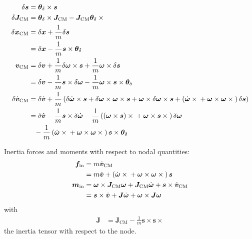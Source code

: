\documentclass[10pt,dvips,fleqn,subeqn]{report}
\newcommand{\T}[1]{\bm{#1}}
\newcommand{\TT}[1]{\bm{#1}}
\begin{document}
\begin{subequations}
\begin{align}
	\delta\T{s}
		&= \T{\theta}_{\delta} \times \T{s} \\
	\delta \TT{J}_{\text{CM}}
		&= \T{\theta}_{\delta} \times \TT{J}_{\text{CM}}
		- \TT{J}_{\text{CM}} \T{\theta}_{\delta} \times{} \\
	\delta\T{x}_{\text{CM}}
		&= \delta\T{x} + \frac{1}{m} \delta\T{s}
		\nonumber \\
		&= \delta\T{x} - \frac{1}{m} \T{s} \times \T{\theta}_{\delta} \\
	\T{v}_{\text{CM}}
		&= \delta\T{v}
		+ \frac{1}{m} \delta\T{\omega} \times \T{s}
		+ \frac{1}{m} \T{\omega} \times \delta\T{s}
		\nonumber \\
		&= \delta\T{v}
		- \frac{1}{m} \T{s} \times \delta\T{\omega}
		- \frac{1}{m} \T{\omega} \times \T{s} \times \T{\theta}_{\delta} \\
	\delta\dot{\T{v}}_{\text{CM}}
		&= \delta\dot{\T{v}}
		+ \frac{1}{m}\plbr{
			\delta\dot{\T{\omega}}\times\T{s}
			+ \delta\T{\omega}\times\T{\omega}\times\T{s}
			+ \T{\omega}\times\delta\T{\omega}\times\T{s}
			+ \plbr{
				\dot{\T{\omega}}\times{}
				+ \T{\omega}\times\T{\omega}\times{}
			} \delta\T{s}
		}
		\nonumber \\
		&= \delta\dot{\T{v}}
			- \frac{1}{m} \T{s} \times \delta\dot{\T{\omega}}
			- \frac{1}{m} \plbr{
				\plbr{\T{\omega}\times\T{s}}\times{}
				+ \T{\omega}\times\T{s}\times{}
			} \delta\T{\omega}
		\nonumber \\ &\hphantom{=}
			- \frac{1}{m} \plbr{
				\dot{\T{\omega}}\times{}
				+ \T{\omega}\times\T{\omega}\times{}
			} \T{s}\times\T{\theta}_{\delta}
\end{align}
\end{subequations}

Inertia forces and moments with respect to nodal quantities:
\begin{subequations}
\begin{align}
	\T{f}_{\text{in}} &= m \dot{\T{v}}_{\text{CM}}
	\nonumber \\
	&=
	m \dot{\T{v}}
	+ \plbr{
		\dot{\T{\omega}} \times{}
		+ \T{\omega} \times \T{\omega} \times{}
	} \T{s} \\
	\T{m}_{\text{in}} &=
	\T{\omega} \times \TT{J}_{\text{CM}} \T{\omega}
	+ \TT{J}_{\text{CM}} \dot{\T{\omega}}
	+ \T{s} \times \dot{\T{v}}_{\text{CM}}
	\nonumber \\
	&= \T{s} \times \dot{\T{v}}
	+ \TT{J} \dot{\T{\omega}}
	+ \T{\omega} \times \TT{J} \T{\omega}
\end{align}
\end{subequations}
with
\begin{align}
	\TT{J} &= \TT{J}_{\text{CM}} - \frac{1}{m} \T{s} \times \T{s} \times{}
\end{align}
the inertia tensor with respect to the node.
\end{document}
